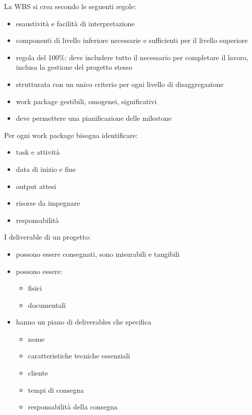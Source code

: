 \documentclass[answers, a4paper, 11pt]{exam}
\begin{document}
La WBS si crea secondo le seguenti regole:

\begin{itemize}
    \item esaustività e facilità di interpretazione
    \item componenti di livello inferiore necessarie e sufficienti per il livello superiore
    \item regola del 100\%: deve includere tutto il necessario per completare il lavoro, inclusa la gestione del progetto stesso
    \item strutturata con un unico criterio per ogni livello di disaggregazione
    \item work package gestibili, omogenei, significativi
    \item deve permettere una pianificazione delle milestone
\end{itemize}

Per ogni work package bisogna identificare:

\begin{itemize}
    \item task e attività
    \item data di inizio e fine
    \item output attesi
    \item risorse da impegnare
    \item responsabilità
\end{itemize}

I deliverable di un progetto:

\begin{itemize}
    \item possono essere consegnati, sono misurabili e tangibili
    \item possono essere:
    \begin{itemize}
        \item fisici
        \item documentali
    \end{itemize}
    \item hanno un piano di deliverables che specifica
    \begin{itemize}
        \item nome
        \item caratteristiche tecniche essenziali
        \item cliente
        \item tempi di consegna
        \item responsabilità della consegna
    \end{itemize}
\end{itemize}
\end{document}
